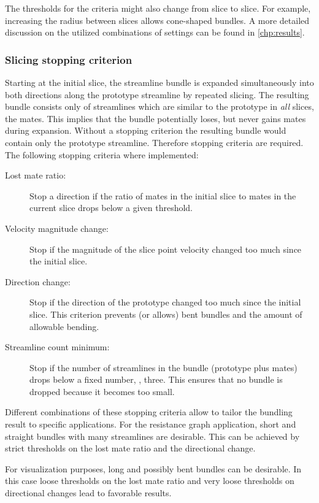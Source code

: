 The thresholds for the criteria might also change from slice to slice. For example, increasing the radius between slices allows cone-shaped bundles. A more detailed discussion on the utilized combinations of settings can be found in \autoref{chp:results}.


\subsubsection{Slicing stopping criterion}
\label{sec:theory:slicing-stopping-criterion}
Starting at the initial slice, the streamline bundle is expanded simultaneously into both directions along the prototype streamline by repeated slicing. The resulting bundle consists only of streamlines which are similar to the prototype in \emph{all} slices, the mates. This implies that the bundle potentially loses, but never gains mates during expansion. Without a stopping criterion the resulting bundle would contain only the prototype streamline. Therefore stopping criteria are required. The following stopping criteria where implemented:
%
\begin{description}
%
  \item[Lost mate ratio:] Stop a direction if the ratio of mates in the initial slice to mates in the current slice drops below a given threshold.
%
  \item[Velocity magnitude change:] Stop if the magnitude of the slice point velocity changed too much since the initial slice.
%
  \item[Direction change:] Stop if the direction of the prototype changed too much since the initial slice. This criterion prevents (or allows) bent bundles and the amount of allowable bending.
%
  \item[Streamline count minimum:] Stop if the number of streamlines in the bundle (prototype plus mates) drops below a fixed number, \eg, three. This ensures that no bundle is dropped because it becomes too small.
%
\end{description}

Different combinations of these stopping criteria allow to tailor the bundling result to specific applications. For the resistance graph application, short and straight bundles with many streamlines are desirable. This can be achieved by strict thresholds on the lost mate ratio and the directional change.

For visualization purposes, long and possibly bent bundles can be desirable. In this case loose thresholds on the lost mate ratio and very loose thresholds on directional changes lead to favorable results.

